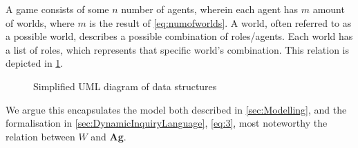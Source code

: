 A game consists of some $n$ number of agents, wherein each agent has $m$ amount of worlds, where $m$ is the result of \cref{eq:numofworlds}.
A world, often referred to as a possible world, describes a possible combination of roles/agents. 
Each world has a list of roles, which represents that specific world's combination. This relation is 
depicted in \cref{fig:DataStructuresUML}.
\begin{comment}
	To provide some context for the upcoming sections, this part will describe the
	data structures they are based upon. \\ \\ A world, often
	referred to as a possible world, describes a possible combination of roles/agents. 
	Most information is unknown to an agent in its environment,
	therefore if a role of another agent is unknown they could be all roles. So for
	each agent, they store their own list of all possible worlds, with every single
	combination of agents and roles. Each world object itself stores whether it is active,
	and number of marks. Marks and is active\footnote{Is active refers to active and inactive
		worlds} both being previously described in \cref{sec:Modelling}.\\ The
	player object stores information about the agent, such as name, role, and alive
	status. Besides storing information it acts as a gateway to functions that
	include the agent. Such as communication, instead of calling a function and
	including the agent, the communication is called directly from the agent object. \\
	The overall data structure is the game object, that encapsulates all
	information and objects into a single object.
\end{comment}
\renewcommand{\umlfillcolor}{white}
\renewcommand{\umldrawcolor}{blue}
\begin{figure}[H]
	\centering
	\vspace*{3mm}
	\caption{Simplified UML diagram of data structures}
	\label{fig:DataStructuresUML}
\end{figure}
We argue this encapsulates the model both described in \cref{sec:Modelling}, and the formalisation in
\cref{sec:DynamicInquiryLanguage}, \cref{eq:3}, most noteworthy the relation between $W$ and \textbf{Ag}.
